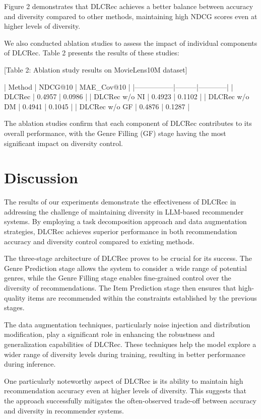 \documentclass[10pt,twocolumn,letterpaper]{article}
\begin{document}
Figure 2 demonstrates that DLCRec achieves a better balance between accuracy and diversity compared to other methods, maintaining high NDCG scores even at higher levels of diversity.

We also conducted ablation studies to assess the impact of individual components of DLCRec. Table 2 presents the results of these studies:

[Table 2: Ablation study results on MovieLens10M dataset]

| Method          | NDCG@10 | MAE_Cov@10 |
|-----------------|---------|------------|
| DLCRec          | 0.4957  | 0.0986     |
| DLCRec w/o NI   | 0.4923  | 0.1102     |
| DLCRec w/o DM   | 0.4941  | 0.1045     |
| DLCRec w/o GF   | 0.4876  | 0.1287     |

The ablation studies confirm that each component of DLCRec contributes to its overall performance, with the Genre Filling (GF) stage having the most significant impact on diversity control.

\section{Discussion}

The results of our experiments demonstrate the effectiveness of DLCRec in addressing the challenge of maintaining diversity in LLM-based recommender systems. By employing a task decomposition approach and data augmentation strategies, DLCRec achieves superior performance in both recommendation accuracy and diversity control compared to existing methods.

The three-stage architecture of DLCRec proves to be crucial for its success. The Genre Prediction stage allows the system to consider a wide range of potential genres, while the Genre Filling stage enables fine-grained control over the diversity of recommendations. The Item Prediction stage then ensures that high-quality items are recommended within the constraints established by the previous stages.

The data augmentation techniques, particularly noise injection and distribution modification, play a significant role in enhancing the robustness and generalization capabilities of DLCRec. These techniques help the model explore a wider range of diversity levels during training, resulting in better performance during inference.

One particularly noteworthy aspect of DLCRec is its ability to maintain high recommendation accuracy even at higher levels of diversity. This suggests that the approach successfully mitigates the often-observed trade-off between accuracy and diversity in recommender systems.
\end{document}
